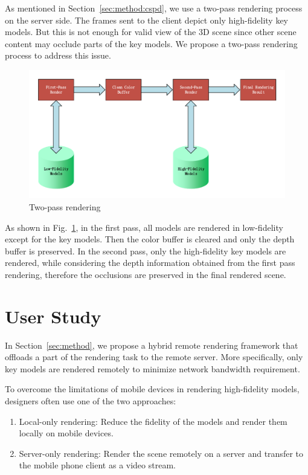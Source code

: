 As mentioned in Section~\ref{sec:method:cspd}, we use a two-pass rendering process on the server side.
The frames sent to the client depict only high-fidelity key models.
But this is not enough for valid view of the 3D scene since other scene content may occlude parts of the key models.
We propose a two-pass rendering process to address this issue.

\begin{figure}[!htbp]
	\includegraphics[width=\textwidth]{figures/two-pass-rendering.pdf}
	\caption{Two-pass rendering}
	\label{fig:tp-rendering}
\end{figure}

As shown in Fig.~\ref{fig:tp-rendering}, in the first pass, all models are rendered in low-fidelity except for the key models. Then the color buffer is cleared and only the depth buffer is preserved. In the second pass, only the high-fidelity key models are rendered, while considering the depth information obtained from the first pass rendering, therefore the occlusions are preserved in the final rendered scene.

\section{User Study}
\label{sec:userstudy}

In Section~\ref{sec:method}, we propose a hybrid remote rendering framework that offloads a part of the rendering task to the remote server. More specifically, only key models are rendered remotely to minimize network bandwidth requirement.

To overcome the limitations of mobile devices in rendering high-fidelity models, designers often use one of the two approaches:
\begin{enumerate}
\item
Local-only rendering: Reduce the fidelity of the models and render them locally on mobile devices.
\item
Server-only rendering: Render the scene remotely on a server and transfer to the mobile phone client as a video stream.
\end{enumerate}

